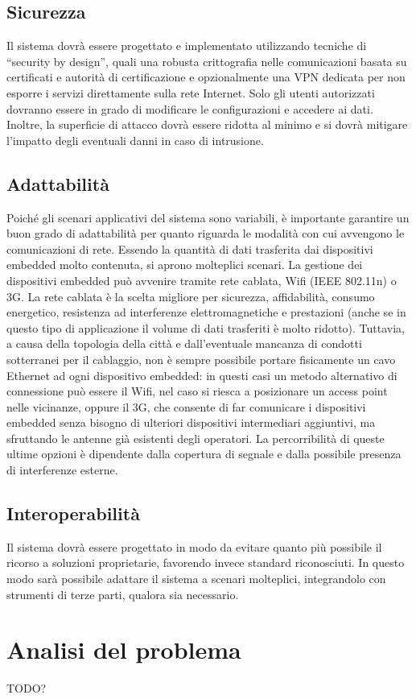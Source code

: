 \subsection{Sicurezza}
Il sistema dovrà essere progettato e implementato utilizzando tecniche di ``security by design'', quali una robusta crittografia nelle comunicazioni basata su certificati e autorità di certificazione e opzionalmente una VPN dedicata per non esporre i servizi direttamente sulla rete Internet. Solo gli utenti autorizzati dovranno essere in grado di modificare le configurazioni e accedere ai dati. Inoltre, la superficie di attacco dovrà essere ridotta al minimo e si dovrà mitigare l'impatto degli eventuali danni in caso di intrusione.
\subsection{Adattabilità}
Poiché gli scenari applicativi del sistema sono variabili, è importante garantire un buon grado di adattabilità per quanto riguarda le modalità con cui avvengono le comunicazioni di rete. Essendo la quantità di dati trasferita dai dispositivi embedded molto contenuta, si aprono molteplici scenari. La gestione dei dispositivi embedded può avvenire tramite rete cablata, Wifi (IEEE 802.11n) o 3G. La rete cablata è la scelta migliore per sicurezza, affidabilità, consumo energetico, resistenza ad interferenze elettromagnetiche e prestazioni (anche se in questo tipo di applicazione il volume di dati trasferiti è molto ridotto). Tuttavia, a causa della topologia della città e dall’eventuale mancanza di condotti sotterranei per il cablaggio, non è sempre possibile portare fisicamente un cavo Ethernet ad ogni dispositivo embedded: in questi casi un metodo alternativo di connessione può essere il Wifi, nel caso si riesca a posizionare un access point nelle vicinanze, oppure il 3G, che consente di far comunicare i dispositivi embedded senza bisogno di ulteriori dispositivi intermediari aggiuntivi, ma sfruttando le antenne già esistenti degli operatori. La percorribilità di queste ultime opzioni è dipendente dalla copertura di segnale e dalla possibile presenza di interferenze esterne.
\subsection{Interoperabilità}
Il sistema dovrà essere progettato in modo da evitare quanto più possibile il ricorso a soluzioni proprietarie, favorendo invece standard riconosciuti. In questo modo sarà possibile adattare il sistema a scenari molteplici, integrandolo con strumenti di terze parti, qualora sia necessario.

\section{Analisi del problema}
TODO?
